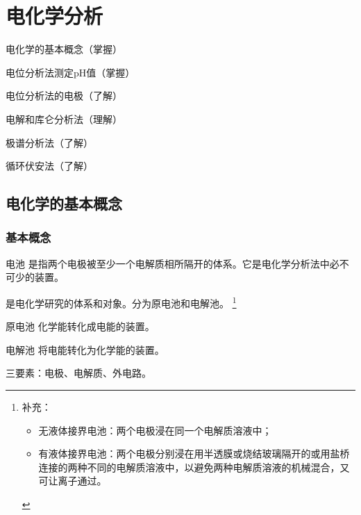 \chapter{电化学分析}

\begin{introduction}
	\item 电化学的基本概念（掌握）
	\item 电位分析法测定pH值（掌握）
	\item 电位分析法的电极（了解）
	\item 电解和库仑分析法（理解）
	\item 极谱分析法（了解）
	\item 循环伏安法（了解）
\end{introduction}



\section{电化学的基本概念}

\subsection{基本概念}
\begin{definition*}{电池}{}
	是指两个电极被至少一个电解质相所隔开的体系。它是电化学分析法中必不可少的装置。
\end{definition*}

是电化学研究的体系和对象。分为原电池和电解池。
\footnote{补充：\begin{itemize}
		\item 无液体接界电池：两个电极浸在同一个电解质溶液中；
		\item 有液体接界电池：两个电极分别浸在用半透膜或烧结玻璃隔开的或用盐桥连接的两种不同的电解质溶液中，以避免两种电解质溶液的机械混合，又可让离子通过。
\end{itemize}}

\begin{definition*}{原电池}{}
	化学能转化成电能的装置。
\end{definition*}

\begin{definition*}{电解池}{}
	将电能转化为化学能的装置。
\end{definition*}
	
三要素：电极、电解质、外电路。

